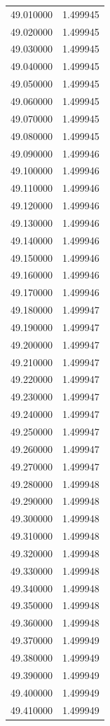 \begin{tabular}{rr}
49.010000 & 1.499945 \\
49.020000 & 1.499945 \\
49.030000 & 1.499945 \\
49.040000 & 1.499945 \\
49.050000 & 1.499945 \\
49.060000 & 1.499945 \\
49.070000 & 1.499945 \\
49.080000 & 1.499945 \\
49.090000 & 1.499946 \\
49.100000 & 1.499946 \\
49.110000 & 1.499946 \\
49.120000 & 1.499946 \\
49.130000 & 1.499946 \\
49.140000 & 1.499946 \\
49.150000 & 1.499946 \\
49.160000 & 1.499946 \\
49.170000 & 1.499946 \\
49.180000 & 1.499947 \\
49.190000 & 1.499947 \\
49.200000 & 1.499947 \\
49.210000 & 1.499947 \\
49.220000 & 1.499947 \\
49.230000 & 1.499947 \\
49.240000 & 1.499947 \\
49.250000 & 1.499947 \\
49.260000 & 1.499947 \\
49.270000 & 1.499947 \\
49.280000 & 1.499948 \\
49.290000 & 1.499948 \\
49.300000 & 1.499948 \\
49.310000 & 1.499948 \\
49.320000 & 1.499948 \\
49.330000 & 1.499948 \\
49.340000 & 1.499948 \\
49.350000 & 1.499948 \\
49.360000 & 1.499948 \\
49.370000 & 1.499949 \\
49.380000 & 1.499949 \\
49.390000 & 1.499949 \\
49.400000 & 1.499949 \\
49.410000 & 1.499949 \\

\end{tabular}
